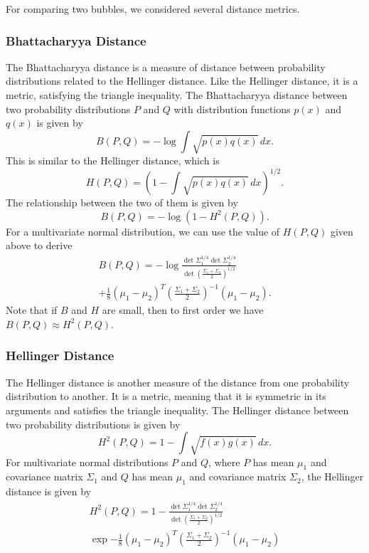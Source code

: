 \documentclass{article}
\newcommand*{\Pn}[1]{\left( #1 \right)}
\begin{document}
For comparing two bubbles, we considered several distance metrics.

\subsubsection{Bhattacharyya Distance}

The Bhattacharyya distance is a measure of distance between probability
distributions related to the Hellinger distance. Like the Hellinger distance,
it is a metric, satisfying the triangle inequality. The Bhattacharyya distance
between two probability distributions $P$ and $Q$ with distribution functions
$p(x)$ and $q(x)$ is given by \cite{pardo}
\[
    B(P,Q)=-\log\int\sqrt{p(x)q(x)}\,dx.
\]
This is similar to the Hellinger distance, which is
\[
    H(P,Q)=\Pn{1-\int\sqrt{p(x)q(x)}\,dx}^{1/2}.
\]
The relationship between the two of them is given by
\[
    B(P,Q)=-\log(1-H^2(P,Q)).
\]
For a multivariate normal distribution, we can use the value of $H(P,Q)$ given
above to derive
\begin{multline*}
    B(P,Q)=-\log\frac{\det\Sigma_1^{1/4}\det\Sigma_2^{1/4}}
    {\det\Pn{\frac{\Sigma_1+\Sigma_2}{2}}^{1/2}}\\
    +\frac18(\mu_1-\mu_2)^T\Pn{\frac{\Sigma_1+\Sigma_2}{2}}^{-1}
    (\mu_1-\mu_2).
\end{multline*}
Note that if $B$ and $H$ are small, then to first order we have $B(P,Q)\approx
H^2(P,Q)$.

\subsubsection{Hellinger Distance}

The Hellinger distance is another measure of the distance from one probability
distribution to another. It is a metric, meaning that it is symmetric in its
arguments and satisfies the triangle inequality. The Hellinger distance between
two probability distributions is given by
\[
    H^2(P,Q)=1-\int \sqrt{f(x)g(x)}\,dx.
\]
For multivariate normal distributions $P$ and $Q$, where $P$ has mean $\mu_1$
and covariance matrix $\Sigma_1$ and $Q$ has mean $\mu_1$ and covariance matrix
$\Sigma_2$, the Hellinger distance is given by \cite{pardo}
\begin{multline*}
    H^2(P,Q)=1-\frac{\det\Sigma_1^{1/4}\det\Sigma_2^{1/4}}
    {\det\Pn{\frac{\Sigma_1+\Sigma_2}{2}}^{1/2}}\\
    \exp{-\frac18(\mu_1-\mu_2)^T\Pn{\frac{\Sigma_1+\Sigma_2}{2}}^{-1}
    (\mu_1-\mu_2)}
\end{multline*}
\end{document}
